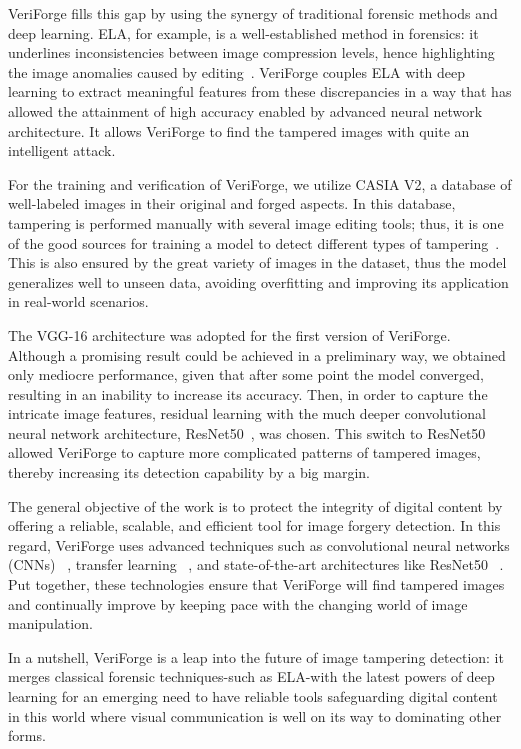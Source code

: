 \documentclass{ieeeaccess}
\begin{document}
VeriForge fills this gap by using the synergy of traditional forensic methods and deep learning. ELA, for example, is a well-established method in forensics: it underlines inconsistencies between image compression levels, hence highlighting the image anomalies caused by editing~\cite{singh2021image}. VeriForge couples ELA with deep learning to extract meaningful features from these discrepancies in a way that has allowed the attainment of high accuracy enabled by advanced neural network architecture. It allows VeriForge to find the tampered images with quite an intelligent attack.

For the training and verification of VeriForge, we utilize CASIA V2, a database of well-labeled images in their original and forged aspects. In this database, tampering is performed manually with several image editing tools; thus, it is one of the good sources for training a model to detect different types of tampering~\cite{7412439}. This is also ensured by the great variety of images in the dataset, thus the model generalizes well to unseen data, avoiding overfitting and improving its application in real-world scenarios.

The VGG-16 architecture was adopted for the first version of VeriForge. Although a promising result could be achieved in a preliminary way, we obtained only mediocre performance, given that after some point the model converged, resulting in an inability to increase its accuracy. Then, in order to capture the intricate image features, residual learning with the much deeper convolutional neural network architecture, ResNet50~\cite{simonyan2015deepconvolutionalnetworkslargescale}, was chosen. This switch to ResNet50 allowed VeriForge to capture more complicated patterns of tampered images, thereby increasing its detection capability by a big margin.


The general objective of the work is to protect the integrity of digital content by offering a reliable, scalable, and efficient tool for image forgery detection. In this regard, VeriForge uses advanced techniques such as convolutional neural networks (CNNs) ~\cite{thepade2021image}, transfer learning~\cite{han2020scene} , and state-of-the-art architectures like ResNet50~\cite{he2016deep} . Put together, these technologies ensure that VeriForge will find tampered images and continually improve by keeping pace with the changing world of image manipulation.

In a nutshell, VeriForge is a leap into the future of image tampering detection: it merges classical forensic techniques-such as ELA-with the latest powers of deep learning for an emerging need to have reliable tools safeguarding digital content in this world where visual communication is well on its way to dominating other forms.
\end{document}
